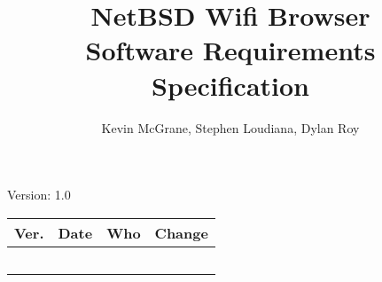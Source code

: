 \documentclass[letterpaper,12pt]{article}
\title{NetBSD Wifi Browser\\Software Requirements Specification}
\author{Kevin McGrane, Stephen Loudiana, Dylan Roy}
\begin{document}
\maketitle

\begin{center}
  Version: 1.0
\end{center}

\vfill
\begin{tabularx}{\linewidth}{|l|l|l|X|}\hline
Ver. & Date & Who & Change \\\hline
     &      &     &        \\\hline
     &      &     &        \\\hline
     &      &     &        \\\hline
     &      &     &        \\\hline
     &      &     &        \\\hline
\end{tabularx}

\newpage







\appendix 



\end{document}
